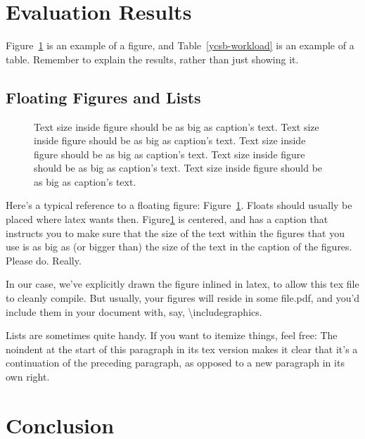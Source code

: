 \documentclass[letter,twocolumn,10pt]{article}
\begin{document}
\section{Evaluation Results}
Figure~\ref{fig:vectors} is an example of a figure,
and Table~\ref{ycsb-workload} is an example of a table.
Remember to explain the results, rather than just showing it. 

\subsection{Floating Figures and Lists}
\label{sec:figs}

\begin{figure}
\begin{center}
\end{center}
\caption{\label{fig:vectors} Text size inside figure should be as big as
  caption's text. Text size inside figure should be as big as
  caption's text. Text size inside figure should be as big as
  caption's text. Text size inside figure should be as big as
  caption's text. Text size inside figure should be as big as
  caption's text. }
\end{figure}


Here's a typical reference to a floating figure:
Figure~\ref{fig:vectors}. Floats should usually be placed where latex
wants then. Figure\ref{fig:vectors} is centered, and has a caption
that instructs you to make sure that the size of the text within the
figures that you use is as big as (or bigger than) the size of the
text in the caption of the figures. Please do. Really.

In our case, we've explicitly drawn the figure inlined in latex, to
allow this tex file to cleanly compile. But usually, your figures will
reside in some file.pdf, and you'd include them in your document
with, say, \textbackslash{}includegraphics.

Lists are sometimes quite handy. If you want to itemize things, feel
free:
\noindent
The noindent at the start of this paragraph in its tex version makes
it clear that it's a continuation of the preceding paragraph, as
opposed to a new paragraph in its own right.

\section{Conclusion}

{\footnotesize 


}
\end{document}
